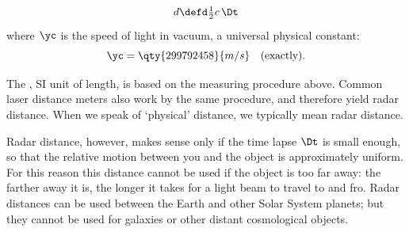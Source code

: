 \begin{equation}
  \label{eq:physical_distance}
  d \defd \tfrac12 c\, \Dt
\end{equation}
where $\yc$ is the speed of light in vacuum, a universal physical constant:
\begin{equation}
  \label{eq:c}
  \yc = \qty{299792458}{m/s}\quad\text{(exactly).}
\end{equation}

%
%
The , SI unit of length, is based on the measuring procedure above. Common laser distance meters also work by the same procedure, and therefore yield radar distance. When we speak of \enquote*{physical} distance, we typically mean radar distance.

Radar distance, however, makes sense only if the time lapse $\Dt$ is small enough, so that the relative motion between you and the object is approximately uniform. For this reason this distance cannot be used if the object is too far away: the farther away it is, the longer it takes for a light beam to travel to and fro. Radar distances can be used between the Earth and other Solar System planets; but they cannot be used for galaxies or other distant cosmological objects.

